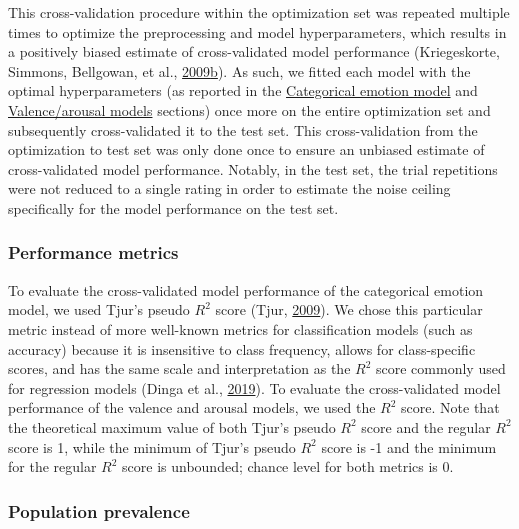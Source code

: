 \documentclass[11pt,american,a4paper,oneside,]{memoir} %
\begin{document}
This cross-validation procedure within the optimization set was repeated multiple times to optimize the preprocessing and model hyperparameters, which results in a positively biased estimate of cross-validated model performance (Kriegeskorte, Simmons, Bellgowan, et al., \protect\hyperlink{ref-Kriegeskorte2009-yz}{2009}\protect\hyperlink{ref-Kriegeskorte2009-yz}{b}). As such, we fitted each model with the optimal hyperparameters (as reported in the \protect\hyperlink{svsd-cat-emo}{Categorical emotion model} and \protect\hyperlink{svsd-valaro}{Valence/arousal models} sections) once more on the entire optimization set and subsequently cross-validated it to the test set. This cross-validation from the optimization to test set was only done once to ensure an unbiased estimate of cross-validated model performance. Notably, in the test set, the trial repetitions were not reduced to a single rating in order to estimate the noise ceiling specifically for the model performance on the test set.

\hypertarget{svsd-perf}{%
\subsubsection{Performance metrics}\label{svsd-perf}}

To evaluate the cross-validated model performance of the categorical emotion model, we used Tjur's pseudo \(R^{2}\) score (Tjur, \protect\hyperlink{ref-Tjur2009-dp}{2009}). We chose this particular metric instead of more well-known metrics for classification models (such as accuracy) because it is insensitive to class frequency, allows for class-specific scores, and has the same scale and interpretation as the \(R^{2}\) score commonly used for regression models (Dinga et al., \protect\hyperlink{ref-Dinga2019-mh}{2019}). To evaluate the cross-validated model performance of the valence and arousal models, we used the \(R^{2}\) score. Note that the theoretical maximum value of both Tjur's pseudo \(R^{2}\) score and the regular \(R^{2}\) score is 1, while the minimum of Tjur's pseudo \(R^{2}\) score is -1 and the minimum for the regular \(R^{2}\) score is unbounded; chance level for both metrics is 0.

\hypertarget{population-prevalence}{%
\subsubsection{Population prevalence}\label{population-prevalence}}
\end{document}
